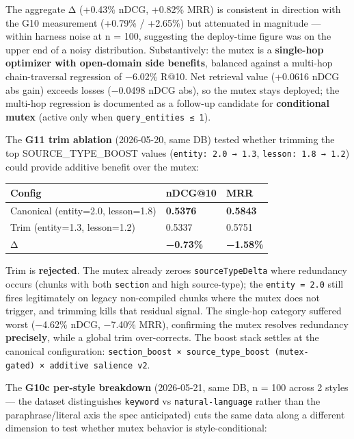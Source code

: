 \documentclass[
]{article}
\newcounter{none} %
\begin{document}
The aggregate Δ (+0.43\% nDCG, +0.82\% MRR) is consistent in direction
with the G10 measurement (+0.79\% / +2.65\%) but attenuated in magnitude
--- within harness noise at n = 100, suggesting the deploy-time figure
was on the upper end of a noisy distribution. Substantively: the mutex
is a \textbf{single-hop optimizer with open-domain side benefits},
balanced against a multi-hop chain-traversal regression of −6.02\% R@10.
Net retrieval value (+0.0616 nDCG abs gain) exceeds losses (−0.0498 nDCG
abs), so the mutex stays deployed; the multi-hop regression is
documented as a follow-up candidate for \textbf{conditional mutex}
(active only when \texttt{query\_entities\ ≤\ 1}).

The \textbf{G11 trim ablation} (2026-05-20, same DB) tested whether
trimming the top SOURCE\_TYPE\_BOOST values
(\texttt{entity:\ 2.0\ →\ 1.3}, \texttt{lesson:\ 1.8\ →\ 1.2}) could
provide additive benefit over the mutex:

{\def\LTcaptype{none} %
\begin{longtable}[]{@{}lll@{}}
\toprule\noalign{}
Config & nDCG@10 & MRR \\
\midrule\noalign{}
\endhead
\bottomrule\noalign{}
\endlastfoot
Canonical (entity=2.0, lesson=1.8) & \textbf{0.5376} &
\textbf{0.5843} \\
Trim (entity=1.3, lesson=1.2) & 0.5337 & 0.5751 \\
Δ & \textbf{−0.73\%} & \textbf{−1.58\%} \\
\end{longtable}
}

Trim is \textbf{rejected}. The mutex already zeroes
\texttt{sourceTypeDelta} where redundancy occurs (chunks with both
\texttt{section} and high source-type); the \texttt{entity\ =\ 2.0}
still fires legitimately on legacy non-compiled chunks where the mutex
does not trigger, and trimming kills that residual signal. The
single-hop category suffered worst (−4.62\% nDCG, −7.40\% MRR),
confirming the mutex resolves redundancy \textbf{precisely}, while a
global trim over-corrects. The boost stack settles at the canonical
configuration:
\texttt{section\_boost\ ×\ source\_type\_boost\ (mutex-gated)\ ×\ additive\ salience\ v2}.

The \textbf{G10c per-style breakdown} (2026-05-21, same DB, n = 100
across 2 styles --- the dataset distinguishes \texttt{keyword} vs
\texttt{natural-language} rather than the paraphrase/literal axis the
spec anticipated) cuts the same data along a different dimension to test
whether mutex behavior is style-conditional:
\end{document}
